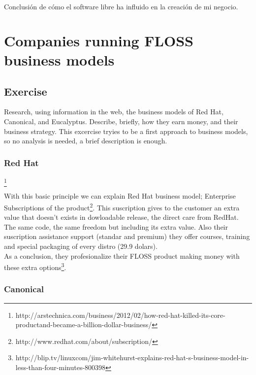 \documentclass[11pt]{scrartcl}
\begin{document}
Conclusión de cómo el software libre ha influido en la creación de mi negocio.

\section{Companies running FLOSS business models}

\subsection{Exercise}

Research, using information in the web, the business models of Red Hat, 
Canonical, and Eucalyptus. Describe, briefly, how they earn money, and their 
business strategy. This excercise tryies to be a first approach to business 
models, so no analysis is needed, a brief description is enough.

\subsubsection{Red Hat}

\footnote{http://arstechnica.com/business/2012/02/how-red-hat-killed-its-core-productand-became-a-billion-dollar-business/}
 
 With this basic principle we can explain Red Hat business model; Enterprise 
 Subscriptions of the product\footnote{http://www.redhat.com/about/subscription/}. 
 This suscription gives to the customer an extra value that doesn't exists
  in dowloadable release, the direct care from RedHat.
 The same code, the same freedom but including its extra value. Also their 
 suscription assistance support (standar and premium) they offer courses,
  training and special packaging of every distro (29.9 dolars).\\
 As a conclusion, they profesionalize their FLOSS product making money with 
 these extra options\footnote{http://blip.tv/linuxcom/jim-whitehurst-explains-red-hat-s-business-model-in-less-than-four-minutes-800398}.

\subsubsection{Canonical}
\end{document}
